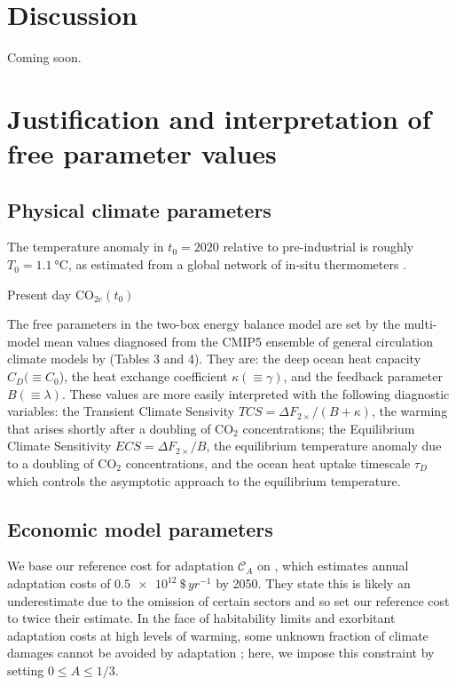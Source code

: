 \documentclass{article}
\begin{document}
\section{Discussion}

Coming soon.


\appendix
\appendixpage
\addappheadtotoc


\section{Justification and interpretation of free parameter values}\label{sec.parameters}

\subsection{Physical climate parameters}
The temperature anomaly in $t_{0}=2020$ relative to pre-industrial is roughly $T_{0} = \SI{1.1}{\celsius}$, as estimated from a global network of in-situ thermometers \citep{lenssen_improvements_2019, nasagisstemp}.

Present day CO$_{2e}(t_{0})$

The free parameters in the two-box energy balance model are set by the multi-model mean values diagnosed from the CMIP5 ensemble of general circulation climate models by \cite{Geoffr} (Tables 3 and 4). They are: the deep ocean heat capacity $C_{D} (\equiv C_{0}$), the heat exchange coefficient $\kappa (\equiv \gamma)$, and the feedback parameter $B (\equiv \lambda)$. These values are more easily interpreted with the following diagnostic variables: the Transient Climate Sensivity $TCS = \Delta F_{2\times}/(B + \kappa)$, the warming that arises shortly after a doubling of CO$_{2}$ concentrations; the Equilibrium Climate Sensitivity $ECS = \Delta F_{2\times}/B$, the equilibrium temperature anomaly due to a doubling of CO$_{2}$ concentrations, and the ocean heat uptake timescale $\tau_{D}$ which controls the asymptotic approach to the equilibrium temperature.

\subsection{Economic model parameters}

We base our reference cost for adaptation  $\mathcal{C}_{A}$ on \cite{agr2018}, which estimates annual adaptation costs of $\SI{0.5e12}{\$\, yr^{-1}}$ by 2050. They state this is likely an underestimate due to the omission of certain sectors and so set our reference cost to twice their estimate. In the face of habitability limits \citep[e.g.][]{sherwood_adaptability_2010} and exorbitant adaptation costs at high levels of warming, some unknown fraction of climate damages cannot be avoided by adaptation \citep{chambwera2014economics}; here, we impose this constraint by setting $0 \le A \le 1/3$.
\end{document}
